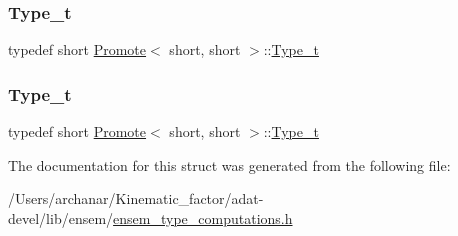 \subsubsection{\texorpdfstring{Type\_t}{Type\_t}\hspace{0.1cm}{\footnotesize\ttfamily [2/3]}}
{\footnotesize\ttfamily typedef short \mbox{\hyperlink{structPromote}{Promote}}$<$ short, short $>$\+::\mbox{\hyperlink{structPromote_3_01short_00_01short_01_4_a7be01cb6c481989a8d153e69778ac59a}{Type\+\_\+t}}}

\mbox{\label{structPromote_3_01short_00_01short_01_4_a7be01cb6c481989a8d153e69778ac59a}} 
\subsubsection{\texorpdfstring{Type\_t}{Type\_t}\hspace{0.1cm}{\footnotesize\ttfamily [3/3]}}
{\footnotesize\ttfamily typedef short \mbox{\hyperlink{structPromote}{Promote}}$<$ short, short $>$\+::\mbox{\hyperlink{structPromote_3_01short_00_01short_01_4_a7be01cb6c481989a8d153e69778ac59a}{Type\+\_\+t}}}



The documentation for this struct was generated from the following file\+:\begin{DoxyCompactItemize}
\item 
/\+Users/archanar/\+Kinematic\+\_\+factor/adat-\/devel/lib/ensem/\mbox{\hyperlink{adat-devel_2lib_2ensem_2ensem__type__computations_8h}{ensem\+\_\+type\+\_\+computations.\+h}}\end{DoxyCompactItemize}
